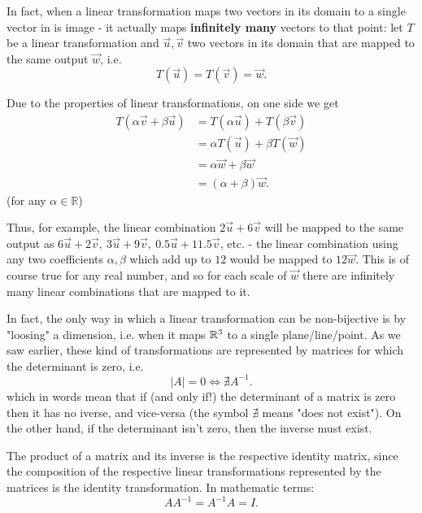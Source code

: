 In fact, when a linear transformation maps two vectors in its domain to a single vector in is image - it actually maps \textbf{infinitely many} vectors to that point: let $T$ be a linear transformation and $\vec{u},\vec{v}$ two vectors in its domain that are mapped to the same output $\vec{w}$, i.e.
\[
	T \left( \vec{u} \right) = T \left( \vec{v} \right) = \vec{w}.
\]

Due to the properties of linear transformations, on one side we get
\begin{align}
	T \left( \alpha\vec{v}+\beta\vec{u} \right) &= T \left( \alpha\vec{u} \right) + T \left( \beta\vec{v} \right)\\ 
												&= \alpha T \left( \vec{u} \right)  + \beta T\left(\vec{w}\right)\\
												&= \alpha\vec{w} + \beta\vec{w}\\
												&= (\alpha+\beta)\vec{w}.
\end{align}
(for any $\alpha\in\mathbb{R}$)

Thus, for example, the linear combination $2\vec{u}+6\vec{v}$ will be mapped to the same output as $6\vec{u}+2\vec{v},\ 3\vec{u}+9\vec{v},\ 0.5\vec{u}+11.5\vec{v}$, etc. - the linear combination using any two coefficients $\alpha,\beta$ which add up to $12$ would be mapped to $12\vec{w}$. This is of course true for any real number, and so for each scale of $\vec{w}$ there are infinitely many linear combinations that are mapped to it.

In fact, the only way in which a linear transformation can be non-bijective is by "loosing" a dimension, i.e. when it maps $\Rs[3]$ to a single plane/line/point. As we saw earlier, these kind of transformations are represented by matrices for which the determinant is zero, i.e.
\begin{equation}
	|A|=0 \Leftrightarrow \nexists A^{-1}.
	\label{eq:determinant_zero_no_inverse}
\end{equation}
which in words mean that if (and only if!) the determinant of a matrix is zero then it has no iverse, and vice-versa (the symbol $\nexists$ means "does not exist"). On the other hand, if the determinant isn't zero, then the inverse must exist.

The product of a matrix and its inverse is the respective identity matrix, since the composition of the respective linear transformations represented by the matrices is the identity transformation. In mathematic terms:
\begin{equation}
	AA^{-1} = A^{-1}A = I.
	\label{eq:matrix_inverse_identity}
\end{equation}

